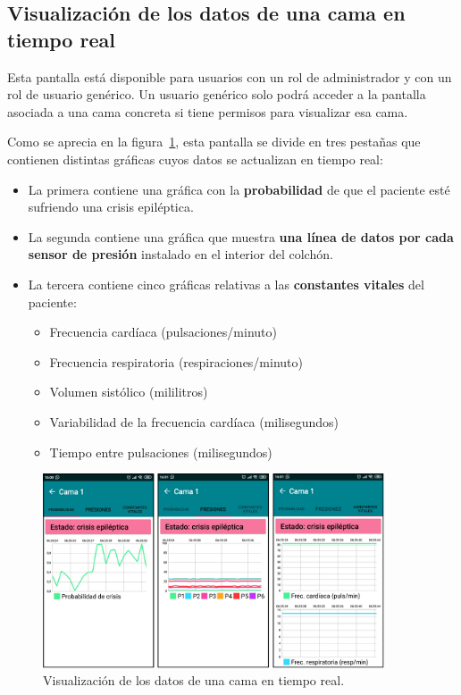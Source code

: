 \subsection{Visualización de los datos de una cama en tiempo real}

Esta pantalla está disponible para usuarios con un rol de administrador y con un rol de usuario genérico. Un usuario genérico solo podrá acceder a la pantalla asociada a una cama concreta si tiene permisos para visualizar esa cama. 

Como se aprecia en la figura~\ref{fig:datoscama}, esta pantalla se divide en tres pestañas que contienen distintas gráficas cuyos datos se actualizan en tiempo real: 

\begin{itemize}
	\item La primera contiene una gráfica con la \textbf{probabilidad} de que el paciente esté sufriendo una crisis epiléptica. 
	\item La segunda contiene una gráfica que muestra \textbf{una línea de datos por cada sensor de presión} instalado en el interior del colchón. 
	\item La tercera contiene cinco gráficas relativas a las \textbf{constantes vitales} del paciente: 
	\begin{itemize}
		\item Frecuencia cardíaca (pulsaciones/minuto)
		\item Frecuencia respiratoria (respiraciones/minuto)
		\item Volumen sistólico (mililitros)
		\item Variabilidad de la frecuencia cardíaca (milisegundos)
		\item Tiempo entre pulsaciones (milisegundos)
	\end{itemize}
\end{itemize}

\begin{figure}[H]
	\centering
	\includegraphics[width=0.9\textwidth]{../img/datoscama.png}
	\caption{Visualización de los datos de una cama en tiempo real.}
	\label{fig:datoscama}
\end{figure}

